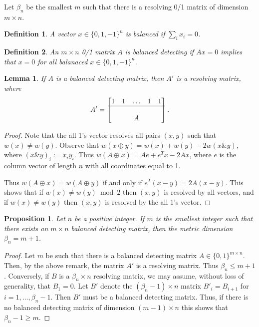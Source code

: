 \documentclass{article}
\newtheorem{definition}{Definition}
\newtheorem{lemma}{Lemma}
\newtheorem{proposition}{Proposition}
\begin{document}
Let $\beta_n$ be the smallest $m$ such that there is a resolving 0/1
matrix of dimension $m \times n$.

\begin{definition}
  A vector $x \in \{0,1,-1\}^n$ is \emph{balanced} if $\sum_i x_i = 0$.
\end{definition}

\begin{definition}
  An $m \times n$ 0/1 matrix $A$ is \emph{balanced detecting} if $A x
  = 0$ implies that $x = 0$ for all balanaced $x \in \{0,1,-1\}^n$.
\end{definition}
\begin{lemma}
  If $A$ is a balanced detecting matrix, then $A'$ is a resolving
  matrix, where
  \begin{displaymath}
    A' =
    \begin{bmatrix}
      1 & 1 & \hdots & 1& 1 \\
      \hline \\
      & & A
    \end{bmatrix}.
  \end{displaymath}
\end{lemma}
\begin{proof}
  Note that the all 1's vector resolves all pairs $(x,y)$ such that
  $w(x) \ne w(y)$.  Observe that $w(x \oplus y) = w(x) + w(y) - 2 w(x
  \& y)$, where $(x \& y)_i := x_i y_i$.  Thus
  $w(A \oplus x) = A e + e^T x - 2 A x$, where $e$ is the column
  vector of length $n$ with all coordinates equal to 1.

  Thus $w(A \oplus x) = w(A \oplus y)$ if and only if
  $e^T(x-y) = 2 A (x-y)$.  This shows that if $w(x) \ne w(y) \bmod 2$
  then $(x,y)$ is resolved by all vectors, and if $w(x) \ne w(y)$ then
  $(x,y)$ is resolved by the all 1's vector.
\end{proof}
\begin{proposition}
Let $n$ be a positive integer.  If $m$ is the smallest integer such
that there exists an $m \times n$ balanced detecting matrix, then the
metric dimension $\beta_n = m + 1$.
\end{proposition}
\begin{proof}
  Let $m$ be such that there is a balanced detecting matrix $A \in
  \{0,1\}^{m \times n}$. Then, by the above remark,
    the matrix $A'$ is a resolving matrix.  Thus $\beta_n \le m+1$.
    Conversely, if $B$ is a $\beta_n \times n$ resolving matrix, we
    may assume, without loss of generality, that $B_1 = 0$.  Let $B'$
    denote the $(\beta_n - 1) \times n$ matrix $B'_i = B_{i+1}$ for
    $i=1, \dots, \beta_n - 1$.  Then $B'$ must be a balanced detecting
    matrix. Thus, if there is no balanced detecting
    matrix of dimension $(m-1) \times n$ this shows that $\beta_n - 1
    \ge m$.
\end{proof}
\end{document}
